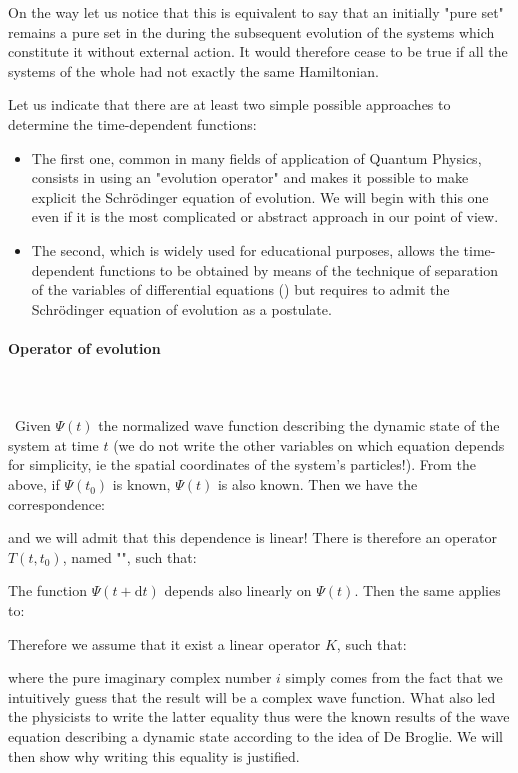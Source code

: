 	On the way let us notice that this is equivalent to say that an initially "pure set" remains a pure set in the during the subsequent evolution of the systems which constitute it without external action. It would therefore cease to be true if all the systems of the whole had not exactly the same Hamiltonian.
	
	Let us indicate that there are at least two simple possible approaches to determine the time-dependent functions:
	\begin{itemize}
		\item The first one, common in many fields of application of Quantum Physics, consists in using an "evolution operator" and makes it possible to make explicit the Schrödinger equation of evolution. We will begin with this one even if it is the most complicated or abstract approach in our point of view.

		\item The second, which is widely used for educational purposes, allows the time-dependent functions to be obtained by means of the technique of separation of the variables of differential equations () but requires to admit the Schrödinger equation of evolution as a postulate.
	\end{itemize}
	
	\paragraph{Operator of evolution}\mbox{}\\\\\
	Given $\Psi(t)$ the normalized wave function describing the dynamic state of the system at time $t$ (we do not write the other variables on which equation depends for simplicity, ie the spatial coordinates of the system's particles!). From the above, if $\Psi(t_0)$ is known, $\Psi(t)$ is also known. Then we have the correspondence:
	
	and we will admit that this dependence is linear! There is therefore an operator $T(t,t_0)$, named "", such that:
	
	The function $\Psi(t+\mathrm{d}t)$ depends also linearly on $\Psi(t)$. Then the same applies to:
	
	Therefore we assume that it exist a linear operator $K$, such that:
	
	where the pure imaginary complex number $i$ simply comes from the fact that we intuitively guess that the result will be a complex wave function. What also led the physicists to write the latter equality thus were the known results of the wave equation describing a dynamic state according to the idea of De Broglie. We will then show why writing this equality is justified.
	
